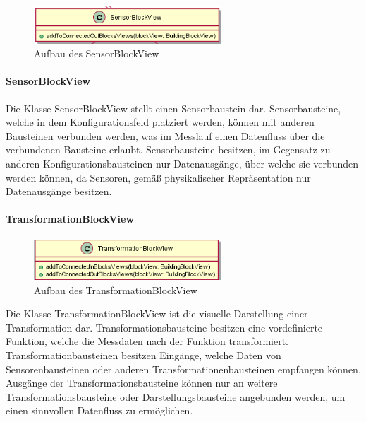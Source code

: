 \documentclass[parskip=full]{scrartcl}
\begin{document}
\begin{figure}[htbp]
	\begin{center}
		\includegraphics[width = 7cm]{Grafiken/View/SensorBlockView.PNG}
		\caption{Aufbau des SensorBlockView}
		\label{Entwurf_Grob}
	\end{center}
\end{figure}

\paragraph{SensorBlockView}

Die Klasse SensorBlockView stellt einen Sensorbaustein dar. 
Sensorbausteine, welche in dem Konfigurationsfeld platziert werden, können mit anderen Bausteinen verbunden werden, was im Messlauf einen Datenfluss über die verbundenen Bausteine erlaubt. Sensorbausteine besitzen, im Gegensatz zu anderen Konfigurationsbausteinen nur Datenausgänge, über welche sie verbunden werden können, da Sensoren, gemäß physikalischer 
Repräsentation nur Datenausgänge besitzen.

\paragraph{TransformationBlockView}

\begin{figure}[htbp]
	\begin{center}
		\includegraphics[width = 7cm]{Grafiken/View/TransformationBlockView.PNG}
		\caption{Aufbau des TransformationBlockView}
		\label{Entwurf_Grob}
	\end{center}
\end{figure}

Die Klasse TransformationBlockView ist die visuelle Darstellung einer Transformation dar. Transformationsbausteine besitzen eine vordefinierte Funktion, welche die Messdaten nach der Funktion transformiert. Transformationbausteinen besitzen Eingänge, welche Daten von Sensorenbausteinen oder anderen Transformationenbausteinen empfangen können. Ausgänge der Transformationsbausteine können nur an weitere Transformationsbausteine oder Darstellungsbausteine angebunden werden, um einen sinnvollen Datenfluss zu ermöglichen. 
\end{document}
